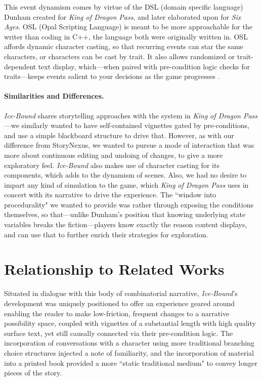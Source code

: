 This event dynamism comes by virtue of the DSL (domain specific language) Dunham created for \textit{King of Dragon Pass}, and later elaborated upon for \textit{Six Ages}. OSL (Opal Scripting Language) is meant to be more approachable for the writer than coding in C++, the language both were originally written in. OSL affords dynamic character casting, so that recurring events can star the same characters, or characters can be cast by trait. It also allows randomized or trait-dependent text display, which---when paired with pre-condition logic checks for traits---keeps events salient to your decisions as the game progresses \cite{dunham_2008}.

\paragraph{Similarities and Differences.}\label{par:dragon-pass-similarities-and-differencs}
\textit{Ice-Bound} shares storytelling approaches with the system in \textit{King of Dragon Pass}---we similarly wanted to have self-contained vignettes gated by pre-conditions, and use a simple blackboard structure to drive that. However, as with our difference from StoryNexus, we wanted to pursue a mode of interaction that was more about continuous editing and undoing of changes, to give a more exploratory feel. \textit{Ice-Bound} also makes use of character casting for its components, which adds to the dynamism of scenes. Also, we had no desire to impart any kind of simulation to the game, which \textit{King of Dragon Pass} uses in concert with its narrative to drive the experience. The ``window into procedurality" we wanted to provide was rather through exposing the conditions themselves, so that---unlike Dunham's position that knowing underlying state variables breaks the fiction---players know exactly the reason content displays, and can use that to further enrich their strategies for exploration.


\section{Relationship to Related Works}\label{sec:ice-bound-relationship-to-related-works}

Situated in dialogue with this body of combinatorial narrative, \textit{Ice-Bound}'s development was uniquely positioned to offer an experience geared around enabling the reader to make low-friction, frequent changes to a narrative possibility space, coupled with vignettes of a substantial length with high quality surface text, yet still causally connected via their pre-condition logic. The incorporation of conversations with a character using more traditional branching choice structures injected a note of familiarity, and the incorporation of material into a printed book provided a more ``static traditional medium" to convey longer pieces of the story.


